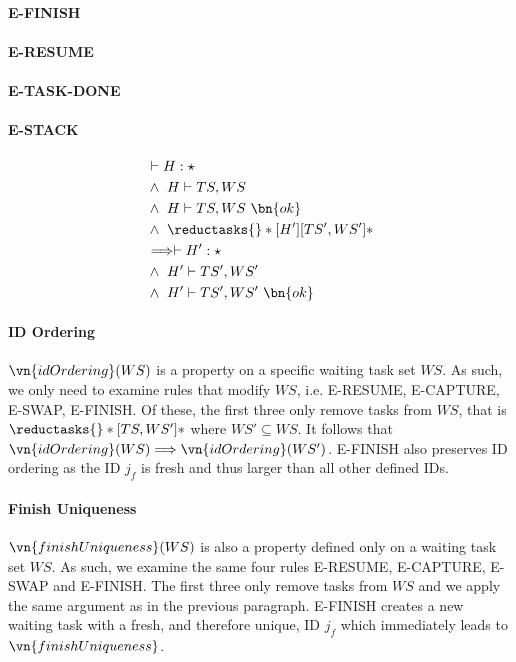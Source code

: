 \paragraph{E-FINISH}

\paragraph{E-RESUME}

\paragraph{E-TASK-DONE}

\paragraph{E-STACK}

\begin{theorem}
    \begin{alignat}{3}
    & \vdash H : \star \label{pres-ts-prem-hstar}\\
    &\wedge\  H \vdash TS, WS \label{pres-ts-prem-tsws}\\
    &\wedge\  H \vdash TS, WS\ \bn{ok} \label{pres-ts-prem-tswsok}\\
    &\wedge\  \reductasks{}*[H']{}[TS', WS']* \label{pres-ts-prem-reduc}\\
    &\Longrightarrow \vdash H' : \star \label{pres-ts-concl-hstar}\\
    &\wedge\  H' \vdash TS', WS' \label{pres-ts-concl-tsws}\\
    &\wedge\  H' \vdash TS', WS'\ \bn{ok} \label{pres-ts-concl-tswsok}
    \end{alignat}
\end{theorem}
\paragraph{ID Ordering}
$\vn{idOrdering}(WS)$ is a property on a specific waiting task set $WS$. As such, we only need to examine rules that modify $WS$, i.e. E-RESUME, E-CAPTURE, E-SWAP, E-FINISH. Of these, the first three only remove tasks from $WS$, that is $\reductasks{}*{}[TS, WS']*$ where $WS' \subseteq WS$. It follows that $\vn{idOrdering}(WS) \Longrightarrow \vn{idOrdering}(WS')$. E-FINISH also preserves ID ordering as the ID $j_f$ is fresh and thus larger than all other defined IDs. 

\paragraph{Finish Uniqueness}
$\vn{finishUniqueness}(WS)$ is also a property defined only on a waiting task set $WS$. As such, we examine the same four rules E-RESUME, E-CAPTURE, E-SWAP and E-FINISH. The first three only remove tasks from $WS$ and we apply the same argument as in the previous paragraph. E-FINISH creates a new waiting task with a fresh, and therefore unique, ID $j_f$ which immediately leads to $\vn{finishUniqueness}$.

